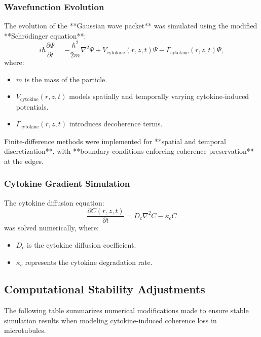 \documentclass[12pt]{article}
\begin{document}
\subsubsection{Wavefunction Evolution}
The evolution of the **Gaussian wave packet** was simulated using the modified **Schrödinger equation**:
\[
i\hbar \frac{\partial \Psi}{\partial t} = -\frac{\hbar^2}{2m} \nabla^2 \Psi + V_{\text{cytokine}}(r, z, t) \Psi - \Gamma_{\text{cytokine}}(r, z, t) \Psi,
\]
where:
\begin{itemize}
    \item \( m \) is the mass of the particle.
    \item \( V_{\text{cytokine}}(r, z, t) \) models spatially and temporally varying cytokine-induced potentials.
    \item \( \Gamma_{\text{cytokine}}(r, z, t) \) introduces decoherence terms.
\end{itemize}
Finite-difference methods were implemented for **spatial and temporal discretization**, with **boundary conditions enforcing coherence preservation** at the edges.

\subsubsection{Cytokine Gradient Simulation}
The cytokine diffusion equation:
\[
\frac{\partial C(r, z, t)}{\partial t} = D_c \nabla^2 C - \kappa_c C
\]
was solved numerically, where:
\begin{itemize}
    \item \(D_c\) is the cytokine diffusion coefficient.
    \item \( \kappa_c \) represents the cytokine degradation rate.
\end{itemize}

\subsection*{Computational Stability Adjustments}
The following table summarizes numerical modifications made to ensure stable simulation results when modeling cytokine-induced coherence loss in microtubules.
\end{document}
